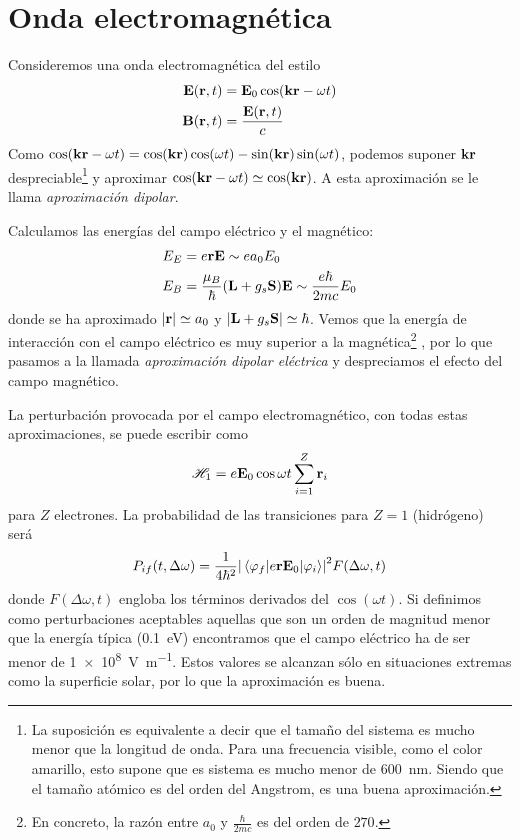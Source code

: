 \section{Onda electromagnética}
Consideremos una onda electromagnética del estilo
\begin{align}
  \bm{\mathrm{E}}(\bm{\mathrm{r}},t) &= \bm{\mathrm{E}}_0 \cos
  (\bm{\mathrm{k}}\bm{\mathrm{r}}-\omega t) \\
  \bm{\mathrm{B}}(\bm{\mathrm{r}},t) &= \frac{\bm{\mathrm{E}}(\bm{\mathrm{r}},t)}{c}
\end{align}
Como $\cos(\bm{\mathrm{k}}\bm{\mathrm{r}}-\omega t) =
\cos(\bm{\mathrm{k}}\bm{\mathrm{r}})\cos(\omega t) -
\sin(\bm{\mathrm{k}}\bm{\mathrm{r}})\sin (\omega t)$, podemos suponer
$\bm{\mathrm{k}}\bm{\mathrm{r}}$ despreciable\footnote{La suposición es
  equivalente a decir que el tamaño del sistema es mucho menor que la
  longitud de onda. Para una frecuencia visible, como el color amarillo, esto supone que es sistema es
  mucho menor de \SI{600}{\nano\metre}. Siendo que el tamaño atómico
  es del orden del Angstrom, es una buena aproximación.} y aproximar
$\cos(\bm{\mathrm{k}}\bm{\mathrm{r}}-\omega t) \simeq
\cos(\bm{\mathrm{k}}\bm{\mathrm{r}})$. A esta aproximación se le llama
\emph{aproximación dipolar}. 

Calculamos las energías del campo eléctrico y el magnético:
\begin{align}
  E_E &= e \bm{\mathrm{r}} \bm{\mathrm{E}} \sim e a_0 E_0\\
  E_B &= \frac{\mu_{\scriptstyle B}}{\hbar} (\bm{\mathrm{L}}+g_s
        \bm{\mathrm{S}}) \bm{\mathrm{E}} \sim \frac{e \hbar}{2mc} E_0
\end{align}
donde se ha aproximado $\abs{\bm{\mathrm{r}}}\simeq a_0$ y
$\abs{\bm{\mathrm{L}}+g_s \bm{\mathrm{S}}}\simeq \hbar$. Vemos que la energía de
interacción con el campo eléctrico es muy superior a la
magnética\footnote{En concreto, la razón entre $a_0$ y
$\frac{\hbar}{2mc}$ es del orden de $270$.}
, por lo que pasamos a la llamada \emph{aproximación dipolar
  eléctrica} y despreciamos el efecto del campo magnético. 

La perturbación provocada por el campo electromagnético, con todas
estas aproximaciones, se puede escribir como
\begin{equation}
  \mathscr{H}_1 = e \bm{\mathrm{E}}_0
  \cos \omega t  \sum_{i=1}^Z \bm{\mathrm{r}}_i
\end{equation}
para $Z$ electrones. 
La probabilidad
de las transiciones para $Z=1$ (hidrógeno) será
\begin{equation}
  P_{if}(t,\Delta\omega) = \frac{1}{4 \hbar^2}
  \abs{\mel{\varphi_f}{e \bm{\mathrm{r}} \bm{\mathrm{E}}_0 }{\varphi_i}}^2 F(\Delta\omega,t)
\end{equation}
donde $F(\Delta\omega,t)$ engloba los términos derivados del
$\cos(\omega t)$.
Si definimos como perturbaciones aceptables aquellas que son un orden
de magnitud menor que la energía típica (\SI{0.1}{\eV}) encontramos
que el campo eléctrico ha de ser menor de \SI{1e8}{\volt\per\metre}.
Estos valores se alcanzan sólo en situaciones extremas como la
superficie solar, por lo que la aproximación es buena.


